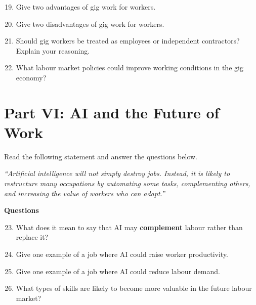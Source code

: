 \documentclass[12pt]{article}
\begin{document}
\begin{enumerate}[label=\arabic*.]
\setcounter{enumi}{18}
\item Give two advantages of gig work for workers.
\vspace{2cm}

\item Give two disadvantages of gig work for workers.
\vspace{2cm}

\item Should gig workers be treated as employees or independent contractors? Explain your reasoning.
\vspace{3cm}

\item What labour market policies could improve working conditions in the gig economy?
\vspace{3cm}
\end{enumerate}

\newpage

\section*{Part VI: AI and the Future of Work}

Read the following statement and answer the questions below.

\textit{``Artificial intelligence will not simply destroy jobs. Instead, it is likely to restructure many occupations by automating some tasks, complementing others, and increasing the value of workers who can adapt.''}

\textbf{Questions}

\begin{enumerate}[label=\arabic*.]
\setcounter{enumi}{22}
\item What does it mean to say that AI may \textbf{complement} labour rather than replace it?
\vspace{2cm}

\item Give one example of a job where AI could raise worker productivity.
\vspace{2cm}

\item Give one example of a job where AI could reduce labour demand.
\vspace{2cm}

\item What types of skills are likely to become more valuable in the future labour market?
\vspace{2.5cm}
\end{enumerate}
\end{document}

